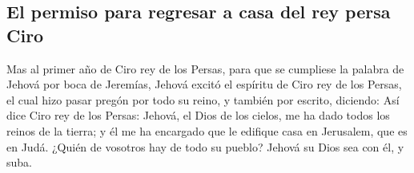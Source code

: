 \hypertarget{el-permiso-para-regresar-a-casa-del-rey-persa-ciro}{%
\subsection{El permiso para regresar a casa del rey persa
Ciro}\label{el-permiso-para-regresar-a-casa-del-rey-persa-ciro}}

 Mas al primer año de Ciro rey de los Persas, para que se
cumpliese la palabra de Jehová por boca de Jeremías, Jehová excitó el
espíritu de Ciro rey de los Persas, el cual hizo pasar pregón por todo
su reino, y también por escrito, diciendo:  Así dice Ciro
rey de los Persas: Jehová, el Dios de los cielos, me ha dado todos los
reinos de la tierra; y él me ha encargado que le edifique casa en
Jerusalem, que es en Judá. ¿Quién de vosotros hay de todo su pueblo?
Jehová su Dios sea con él, y suba.

